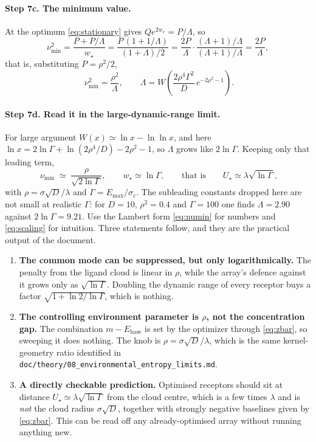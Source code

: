 \documentclass[11pt,a4paper]{article}
\newcommand{\Ebase}{E_{\mathrm{base}}}
\newcommand{\Emax}{E_{\mathrm{max}}}
\begin{document}
\paragraph{Step 7c. The minimum value.} At the optimum \eqref{eq:stationary} gives
$Qe^{2w_\star}=P/\Lambda$, so
\begin{equation}
  \nu_{\min}^2 = \frac{P+P/\Lambda}{w_\star}
   = \frac{P\,(1+1/\Lambda)}{(1+\Lambda)/2}
   = \frac{2P}{\Lambda}\cdot\frac{(\Lambda+1)/\Lambda}{(\Lambda+1)/\Lambda}
   = \frac{2P}{\Lambda},
\end{equation}
that is, substituting $P=\rho^2/2$,
\begin{equation}
  \boxed{\;\nu_{\min}^2 = \frac{\rho^2}{\Lambda},
   \qquad \Lambda = W\!\left(\frac{2\rho^4\Gamma^2}{D}\,e^{-2\rho^2-1}\right). }
  \label{eq:numin}
\end{equation}

\paragraph{Step 7d. Read it in the large-dynamic-range limit.} For large argument
$W(x)\simeq\ln x-\ln\ln x$, and here
$\ln x = 2\ln\Gamma+\ln(2\rho^4/D)-2\rho^2-1$, so $\Lambda$ grows like $2\ln\Gamma$.
Keeping only that leading term,
\begin{equation}
  \boxed{\;\nu_{\min}\;\simeq\;\frac{\rho}{\sqrt{2\ln\Gamma}},
   \qquad
   w_\star \simeq \ln\Gamma,
   \qquad\text{that is}\qquad
   U_\star \simeq \lambda\sqrt{\ln\Gamma}, }
  \label{eq:scaling}
\end{equation}
with $\rho=\sigma\sqrt{D}/\lambda$ and $\Gamma=\Emax/\sigma_c$. The subleading constants
dropped here are not small at realistic $\Gamma$: for $D=10$, $\rho^2=0.4$ and
$\Gamma=100$ one finds $\Lambda=2.90$ against $2\ln\Gamma=9.21$. Use the Lambert form
\eqref{eq:numin} for numbers and \eqref{eq:scaling} for intuition. Three statements
follow, and they are the practical output of the document.
\begin{enumerate}
  \item \textbf{The common mode can be suppressed, but only logarithmically.} The
    penalty from the ligand cloud is linear in $\rho$, while the array's defence against
    it grows only as $\sqrt{\ln\Gamma}$. Doubling the dynamic range of every receptor
    buys a factor $\sqrt{1+\ln 2/\ln\Gamma}$, which is nothing.
  \item \textbf{The controlling environment parameter is $\rho$, not the concentration
    gap.} The combination $m-\Ebase$ is set by the optimizer through \eqref{eq:zbar}, so
    sweeping it does nothing. The knob is $\rho=\sigma\sqrt{D}/\lambda$, which is the
    same kernel-geometry ratio identified in
    \texttt{doc/theory/08\_environmental\_entropy\_limits.md}.
  \item \textbf{A directly checkable prediction.} Optimised receptors should sit at
    distance $U_\star\simeq\lambda\sqrt{\ln\Gamma}$ from the cloud centre, which is a few
    times $\lambda$ and is \emph{not} the cloud radius $\sigma\sqrt{D}$, together with
    strongly negative baselines given by \eqref{eq:zbar}. This can be read off any
    already-optimised array without running anything new.
\end{enumerate}
\end{document}
